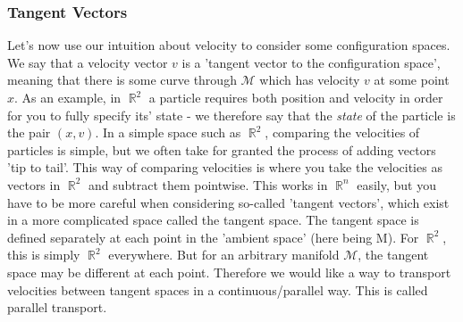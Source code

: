 \documentclass{article}
\DeclareMathOperator{\RR}{\mathbb{R}}
\begin{document}
\subsubsection{Tangent Vectors}

Let's now use our intuition about velocity to consider some configuration spaces. We say that a velocity vector $v$ is a 'tangent vector to the configuration space', meaning that there is some curve through $\mathcal{M}$ which has velocity $v$ at some point $x$. As an example, in $\RR^2$ a particle requires both position and velocity in order for you to fully specify its' state - we therefore say that the \textit{state} of the particle is the pair $(x,v)$. In a simple space such as $\RR^2$, comparing the velocities of particles is simple, but we often take for granted the process of adding vectors 'tip to tail'. This way of comparing velocities is where you take the velocities as vectors in $\RR^2$ and subtract them pointwise. This works in $\RR^n$ easily, but you have to be more careful when considering so-called 'tangent vectors', which exist in a more complicated space called the tangent space. The tangent space is defined separately at each point in the 'ambient space' (here being \textrm{M}). For $\RR^2$, this is simply $\RR^2$ everywhere. But for an arbitrary manifold $\mathcal{M}$, the tangent space may be different at each point. Therefore we would like a way to transport velocities between tangent spaces in a continuous/parallel way. This is called parallel transport.
\end{document}
